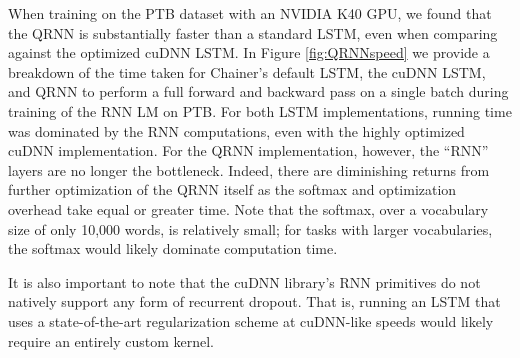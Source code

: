 \documentclass{article} \usepackage{iclr2017_conference,times}
\begin{document}
When training on the PTB dataset with an NVIDIA K40 GPU, we found that the QRNN is substantially faster than a standard LSTM, even when comparing against the optimized cuDNN LSTM.
In Figure \ref{fig:QRNNspeed} we provide a breakdown of the time taken for Chainer's default LSTM, the cuDNN LSTM, and QRNN to perform a full forward and backward pass on a single batch during training of the RNN LM on PTB.
For both LSTM implementations, running time was dominated by the RNN computations, even with the highly optimized cuDNN implementation.
For the QRNN implementation, however, the ``RNN'' layers are no longer the bottleneck.
Indeed, there are diminishing returns from further optimization of the QRNN itself as the softmax and optimization overhead take equal or greater time.
Note that the softmax, over a vocabulary size of only 10,000 words, is relatively small; for tasks with larger vocabularies, the softmax would likely dominate computation time.

It is also important to note that the cuDNN library's RNN primitives do not natively support any form of recurrent dropout. That is, running an LSTM that uses a state-of-the-art regularization scheme at cuDNN-like speeds would likely require an entirely custom kernel.
\end{document}
